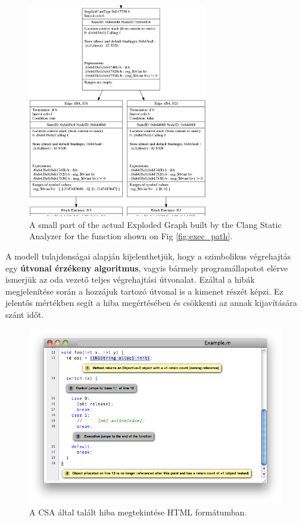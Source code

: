 \documentclass[oneside, a4paper, 12pt]{article}
\theoremstyle{definition}
\begin{document}
\begin{figure}[h]
	\centering
	\includegraphics[width=0.7\textwidth]{img/eg}
	\caption{A small part of the actual Exploded Graph built by the Clang 
	Static Analyzer for the function shown on Fig \ref{fig:exec_path}.}
	\label{fig:exploded_graph2}
\end{figure}

A modell tulajdonságai alapján kijelenthetjük, hogy a szimbolikus végrehajtás
egy \textbf{útvonal érzékeny algoritmus}, vagyis bármely programállapotot elérve
ismerjük az oda vezető teljes végrehajtási útvonalat. Ezáltal a hibák 
megjelenítése
során a hozzájuk tartozó útvonal is a kimenet részét képzi. Ez jelentős
mértékben segít a hiba megértésében és csökkenti az annak kijavítására szánt
időt.

\begin{figure}[h]
	\centering
	\includegraphics[width=1\textwidth]{img/view}
	\caption{A CSA által talált hiba megtekintése HTML formátumban.}
	\label{fig:hibak_megjelenitese}
\end{figure}
\end{document}
